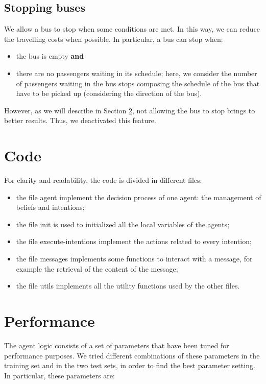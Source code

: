 \documentclass{article}
\begin{document}
\subsection{Stopping buses}
\label{sec:stop}
We allow a bus to stop when some conditions are met. In this way, we can reduce the travelling costs when possible. In particular, a bus can stop when:

\begin{itemize}
\item the bus is empty \textbf{and}
\item there are no passengers waiting in its schedule; here, we consider the number of passengers waiting in the bus stops composing the schedule of the bus that have to be picked up (considering the direction of the bus).
\end{itemize}

However, as we will describe in Section \ref{sec:tuning}, not allowing the bus to stop brings to better results. Thus, we deactivated this feature.

\section{Code}
For clarity and readability, the code is divided in different files:

\begin{itemize}
\item the file agent implement the decision process of one agent: the management of beliefs and intentions;
\item the file init is used to initialized all the local variables of the agents;
\item the file execute-intentions implement the actions related to every intention;
\item the file messages implements some functions to interact with a message, for example the retrieval of the content of the message;
\item the file utils implements all the utility functions used by the other files.
\end{itemize} 

\section{Performance}
\label{sec:tuning}
The agent logic consists of a set of parameters that have been tuned for performance purposes. We tried different combinations of these parameters in the training set and in the two test sets, in order to find the best parameter setting. In particular, these parameters are:
\end{document}
